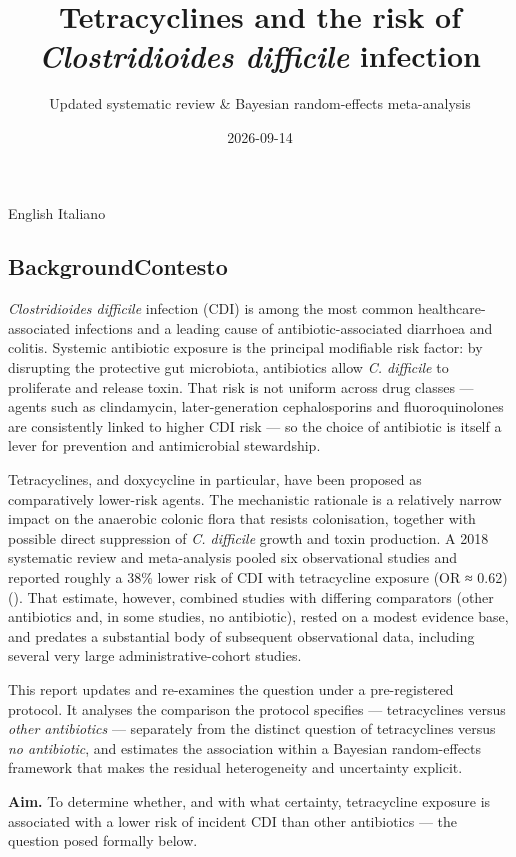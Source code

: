 \documentclass[
  letterpaper,
  DIV=11,
  numbers=noendperiod]{scrartcl}
\title{Tetracyclines and the risk of \emph{Clostridioides difficile}
infection}
\subtitle{Updated systematic review \& Bayesian random-effects
meta-analysis}
\author{}
\date{2026-09-14}
\begin{document}
\maketitle


English Italiano

\subsection{\texorpdfstring{{Background}{Contesto}}{BackgroundContesto}}\label{backgroundcontesto}

\emph{Clostridioides difficile} infection (CDI) is among the most common
healthcare-associated infections and a leading cause of
antibiotic-associated diarrhoea and colitis. Systemic antibiotic
exposure is the principal modifiable risk factor: by disrupting the
protective gut microbiota, antibiotics allow \emph{C. difficile} to
proliferate and release toxin. That risk is not uniform across drug
classes --- agents such as clindamycin, later-generation cephalosporins
and fluoroquinolones are consistently linked to higher CDI risk --- so
the choice of antibiotic is itself a lever for prevention and
antimicrobial stewardship.

Tetracyclines, and doxycycline in particular, have been proposed as
comparatively lower-risk agents. The mechanistic rationale is a
relatively narrow impact on the anaerobic colonic flora that resists
colonisation, together with possible direct suppression of \emph{C.
difficile} growth and toxin production. A 2018 systematic review and
meta-analysis pooled six observational studies and reported roughly a
38\% lower risk of CDI with tetracycline exposure (OR ≈ 0.62)
(). That estimate,
however, combined studies with differing comparators (other antibiotics
and, in some studies, no antibiotic), rested on a modest evidence base,
and predates a substantial body of subsequent observational data,
including several very large administrative-cohort studies.

This report updates and re-examines the question under a pre-registered
protocol. It analyses the comparison the protocol specifies ---
tetracyclines versus \emph{other antibiotics} --- separately from the
distinct question of tetracyclines versus \emph{no antibiotic}, and
estimates the association within a Bayesian random-effects framework
that makes the residual heterogeneity and uncertainty explicit.

\textbf{Aim.} To determine whether, and with what certainty,
tetracycline exposure is associated with a lower risk of incident CDI
than other antibiotics --- the question posed formally below.
\end{document}
